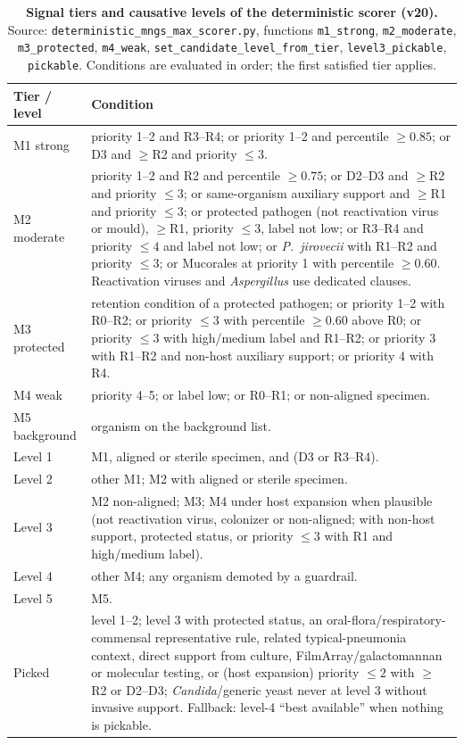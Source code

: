 \documentclass[11pt,a4paper]{article}
\newcommand{\filmarray}{FilmArray\xspace}
\newcommand{\vtwenty}{v20\xspace}
\begin{document}
\begin{table}[h]
\centering
\caption{\textbf{Signal tiers and causative levels of the deterministic scorer (\vtwenty).} Source: \texttt{deterministic\_mngs\_max\_scorer.py}, functions \texttt{m1\_strong}, \texttt{m2\_moderate}, \texttt{m3\_protected}, \texttt{m4\_weak}, \texttt{set\_candidate\_level\_from\_tier}, \texttt{level3\_pickable}, \texttt{pickable}. Conditions are evaluated in order; the first satisfied tier applies.}
\label{tab:s2}
\footnotesize
\begin{tabular}{p{2.2cm}p{12.9cm}}
\toprule
Tier / level & Condition \\
\midrule
M1 strong & priority 1--2 and R3--R4; or priority 1--2 and percentile $\ge 0.85$; or D3 and $\ge$R2 and priority $\le 3$. \\
M2 moderate & priority 1--2 and R2 and percentile $\ge 0.75$; or D2--D3 and $\ge$R2 and priority $\le 3$; or same-organism auxiliary support and $\ge$R1 and priority $\le 3$; or protected pathogen (not reactivation virus or mould), $\ge$R1, priority $\le 3$, label not low; or R3--R4 and priority $\le 4$ and label not low; or \textit{P.~jirovecii} with R1--R2 and priority $\le 3$; or Mucorales at priority 1 with percentile $\ge 0.60$. Reactivation viruses and \textit{Aspergillus} use dedicated clauses. \\
M3 protected & retention condition of a protected pathogen; or priority 1--2 with R0--R2; or priority $\le 3$ with percentile $\ge 0.60$ above R0; or priority $\le 3$ with high/medium label and R1--R2; or priority 3 with R1--R2 and non-host auxiliary support; or priority 4 with R4. \\
M4 weak & priority 4--5; or label low; or R0--R1; or non-aligned specimen. \\
M5 background & organism on the background list. \\
\midrule
Level 1 & M1, aligned or sterile specimen, and (D3 or R3--R4). \\
Level 2 & other M1; M2 with aligned or sterile specimen. \\
Level 3 & M2 non-aligned; M3; M4 under host expansion when plausible (not reactivation virus, colonizer or non-aligned; with non-host support, protected status, or priority $\le 3$ with R1 and high/medium label). \\
Level 4 & other M4; any organism demoted by a guardrail. \\
Level 5 & M5. \\
\midrule
Picked & level 1--2; level 3 with protected status, an oral-flora/respiratory-commensal representative rule, related typical-pneumonia context, direct support from culture, \filmarray/galactomannan or molecular testing, or (host expansion) priority $\le 2$ with $\ge$R2 or D2--D3; \textit{Candida}/generic yeast never at level 3 without invasive support. Fallback: level-4 ``best available'' when nothing is pickable. \\
\bottomrule
\end{tabular}
\end{table}
\end{document}
